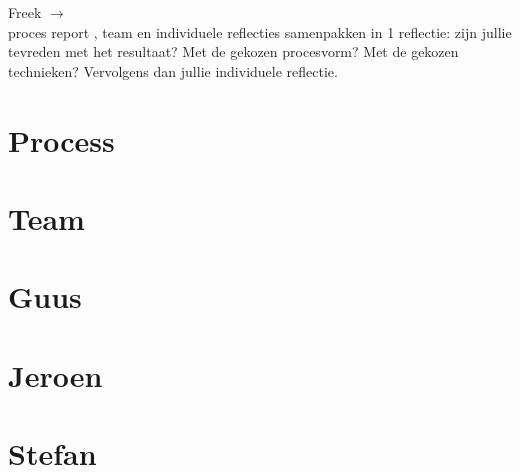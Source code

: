 \begin{tcolorbox}[colback=yellow!30]
Freek $\rightarrow$ \\ 
proces report , team en individuele reflecties samenpakken in 1 reflectie: zijn jullie tevreden met het resultaat? Met de gekozen procesvorm? Met de gekozen technieken? Vervolgens dan jullie individuele reflectie.
\end{tcolorbox}
\section{Process}
\section{Team}
\section{Guus}
\section{Jeroen}
\section{Stefan}



